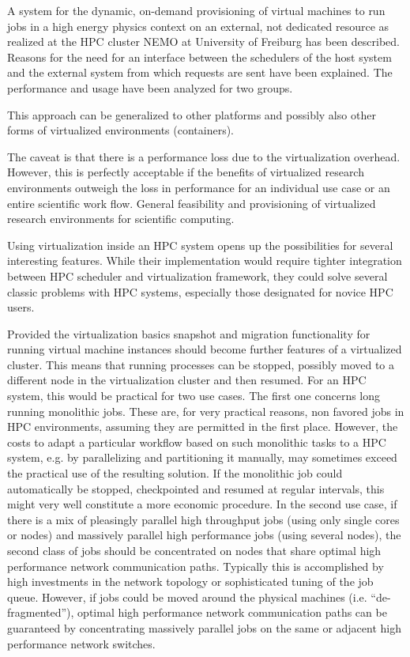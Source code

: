 A system for the dynamic, on-demand provisioning of virtual machines to run jobs
in a high energy physics context on an external, not dedicated resource as
realized at the HPC cluster NEMO at University of Freiburg has been
described.  Reasons for the need for an interface between the schedulers of the
host system and the external system from which requests are sent have been
explained.  The performance and usage have been analyzed for two groups. 

This approach can be generalized to other platforms and possibly also other
forms of virtualized environments (containers).

The caveat is that there is a performance loss due to the virtualization
overhead. However, this is perfectly acceptable if the benefits of virtualized
research environments outweigh the loss in performance for an individual use
case or an entire scientific work flow. General feasibility and provisioning of
virtualized research environments for scientific computing.

Using virtualization inside an HPC system opens up the possibilities for several
interesting features. While their implementation would require tighter
integration between HPC scheduler and virtualization framework, they could solve
several classic problems with HPC systems, especially those designated for
novice HPC users. 

Provided the virtualization basics snapshot and migration functionality for
running virtual machine instances should become further features of a
virtualized cluster. This means that running processes can be stopped, possibly
moved to a different node in the virtualization cluster and then resumed. For an
HPC system, this would be practical for two use cases. The first one concerns
long running monolithic jobs. These are, for very practical reasons, non favored
jobs in HPC environments, assuming they are permitted in the first place.
However, the costs to adapt a particular workflow based on such monolithic tasks
to a HPC system, e.g. by parallelizing and partitioning it manually, may
sometimes exceed the practical use of the resulting solution. If the monolithic
job could automatically be stopped, checkpointed and resumed at regular
intervals, this might very well constitute a more economic procedure. In the
second use case, if there is a mix of pleasingly parallel high throughput jobs
(using only single cores or nodes) and massively parallel high performance jobs
(using several nodes), the second class of jobs should be concentrated on nodes
that share optimal high performance network communication paths. Typically this
is accomplished by high investments in the network topology or sophisticated
tuning of the job queue. However, if jobs could be moved around the physical
machines (i.e. ``de-fragmented''), optimal high performance network communication
paths can be guaranteed by concentrating massively parallel jobs on the same or
adjacent high performance network switches.

